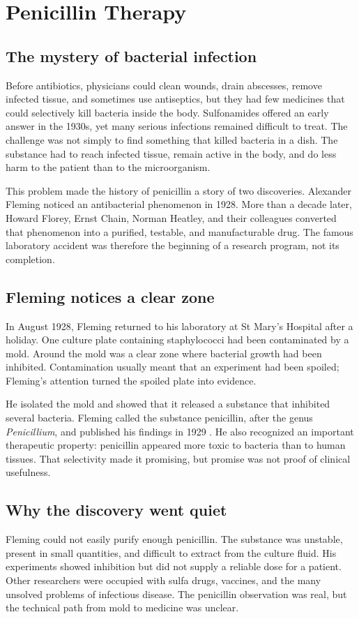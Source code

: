 \documentclass[12pt,oneside]{book}
\begin{document}
\chapter[Penicillin Therapy]{Penicillin Therapy}

\section{The mystery of bacterial infection}
Before antibiotics, physicians could clean wounds, drain abscesses, remove
infected tissue, and sometimes use antiseptics, but they had few medicines that
could selectively kill bacteria inside the body. Sulfonamides offered an early
answer in the 1930s, yet many serious infections remained difficult to treat.
The challenge was not simply to find something that killed bacteria in a dish.
The substance had to reach infected tissue, remain active in the body, and do
less harm to the patient than to the microorganism.

This problem made the history of penicillin a story of two discoveries. Alexander
Fleming noticed an antibacterial phenomenon in 1928. More than a decade later,
Howard Florey, Ernst Chain, Norman Heatley, and their colleagues converted that
phenomenon into a purified, testable, and manufacturable drug. The famous
laboratory accident was therefore the beginning of a research program, not its
completion.

\section{Fleming notices a clear zone}
In August 1928, Fleming returned to his laboratory at St Mary's Hospital after
a holiday. One culture plate containing staphylococci had been contaminated by
a mold. Around the mold was a clear zone where bacterial growth had been
inhibited. Contamination usually meant that an experiment had been spoiled;
Fleming's attention turned the spoiled plate into evidence.

He isolated the mold and showed that it released a substance that inhibited
several bacteria. Fleming called the substance penicillin, after the genus
\emph{Penicillium}, and published his findings in 1929 \cite{fleming1929}.
He also recognized an important therapeutic property: penicillin appeared more
toxic to bacteria than to human tissues. That selectivity made it promising,
but promise was not proof of clinical usefulness.

\section{Why the discovery went quiet}
Fleming could not easily purify enough penicillin. The substance was unstable,
present in small quantities, and difficult to extract from the culture fluid.
His experiments showed inhibition but did not supply a reliable dose for a
patient. Other researchers were occupied with sulfa drugs, vaccines, and the
many unsolved problems of infectious disease. The penicillin observation was
real, but the technical path from mold to medicine was unclear.
\end{document}
